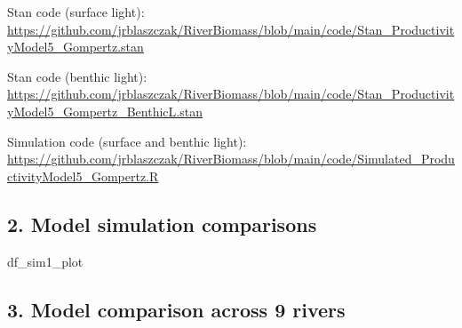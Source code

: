 \documentclass[
]{article}
\begin{document}
Stan code (surface light):
\url{https://github.com/jrblaszczak/RiverBiomass/blob/main/code/Stan_ProductivityModel5_Gompertz.stan}

Stan code (benthic light):
\url{https://github.com/jrblaszczak/RiverBiomass/blob/main/code/Stan_ProductivityModel5_Gompertz_BenthicL.stan}

Simulation code (surface and benthic light):
\url{https://github.com/jrblaszczak/RiverBiomass/blob/main/code/Simulated_ProductivityModel5_Gompertz.R}

\hypertarget{model-simulation-comparisons}{%
\subsection{2. Model simulation
comparisons}\label{model-simulation-comparisons}}

df\_sim1\_plot

\hypertarget{model-comparison-across-9-rivers}{%
\subsection{3. Model comparison across 9
rivers}\label{model-comparison-across-9-rivers}}
\end{document}
